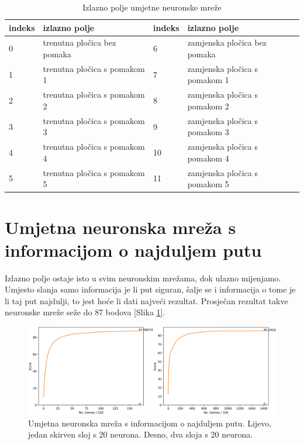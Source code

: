 \documentclass[zavrsnirad]{fer}
\begin{document}
\begin{table}[]
	\centering
	\begin{tabular}{|l|l|l|l|}
		\hline
		indeks & izlazno polje                & indeks & izlazno polje                 \\ \hline
		0      & trenutna pločica bez pomaka  & 6      & zamjenska pločica bez pomaka  \\
		1      & trenutna pločica s pomakom 1 & 7      & zamjenska pločica s pomakom 1 \\
		2      & trenutna pločica s pomakom 2 & 8      & zamjenska pločica s pomakom 2 \\
		3      & trenutna pločica s pomakom 3 & 9      & zamjenska pločica s pomakom 3 \\
		4      & trenutna pločica s pomakom 4 & 10     & zamjenska pločica s pomakom 4 \\
		5      & trenutna pločica s pomakom 5 & 11     & zamjenska pločica s pomakom 5 \\ \hline
	\end{tabular}
	\caption{Izlazno polje umjetne neuronske mreže}
	\label{tab:ulazna_polja}
\end{table}


\section{Umjetna neuronska mreža s informacijom o najduljem putu}
\label{pog:neuronska_najdulji}

Izlazno polje ostaje isto u svim neuronskim mrežama, dok ulazno mijenjamo. Umjesto slanja samo informacija je li put siguran, šalje se i informacija o tome je li taj put najdulji, to jest hoće li dati najveći rezultat. Prosječan rezultat takve neuronske mreže seže do 87 bodova [Slika \ref{slk:second_neural}].

\begin{figure}[htb]
	\centering
	\includegraphics[width=0.88\linewidth]{Figures/neural_second.png} 
	\caption{Umjetna neuronska mreža s informacijom o najduljem putu. Lijevo, jedan skirven sloj s 20 neurona. Desno, dva sloja s 20 neurona.}
	\label{slk:second_neural}
\end{figure}
\end{document}
